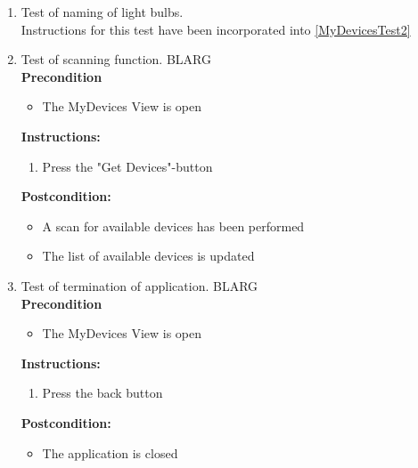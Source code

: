 \documentclass[a4paper]{article}
\newlength{\testlabellength}
\newenvironment{testlist}{\begin{enumerate}[label=\bfseries Instruction \thesubsection.\arabic* , labelindent=0pt, labelwidth=\testlabellength , leftmargin=2cm]}{\end{enumerate}}
\newenvironment{precondition}{
{\color{white}BLARG}\\ 
\textbf{Precondition}
\begin{itemize}[labelindent=0cm, labelwidth=2cm , leftmargin=1cm]
}
{\end{itemize}}
\newenvironment{instruction}{
\textbf{Instructions:}
\begin{enumerate}[label=\bfseries  \arabic*., labelindent=0cm, labelwidth=2cm , leftmargin=1cm]
}
{\end{enumerate}}
\newenvironment{postcondition}{
\textbf{Postcondition:}
\begin{itemize}[labelindent=0cm, labelwidth=2cm , leftmargin=1cm]
}
{\end{itemize}}
\begin{document}
\begin{appendices}
\begin{testlist}
		\begin{instruction}
			\item Check that the name of each sensor device is "Sensor"
			\item Check that the address of each sensor is their MAC address
			\item Check that the id of each sensor is their identifier
			\item Check that the name of each light bulb is "Light Bulb"
			\item Check that the address of each light bulb is their MAC address
			\item Check that the id of each light bulb is their identifier
		\end{instruction}
		   
   
	\item Test of naming of light bulbs. \\
		Instructions for this test have been incorporated into \ref{MyDevicesTest2}

   
	\item Test of scanning function.
		\begin{precondition}
			\item The MyDevices View is open
		\end{precondition}
		\begin{instruction}
			\item Press the "Get Devices"-button
		\end{instruction}
		\begin{postcondition}
			\item A scan for available devices has been performed
			\item The list of available devices is updated
		\end{postcondition}
		   
   
	\item Test of termination of application.
		\begin{precondition}
			\item The MyDevices View is open
		\end{precondition}
		\begin{instruction}
			\item Press the back button
		\end{instruction}
		\begin{postcondition}
			\item The application is closed
		\end{postcondition}
		   

\end{testlist}
\end{appendices}
\end{document}
